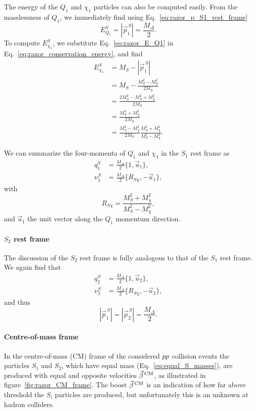 The energy of the $Q_1$ and $\chi_1$ particles can also be computed easily. 
From the masslessness of $Q_1$, we immediately find using Eq.~\ref{eq:razor_p_S1_rest_frame}
\begin{equation}
  E^S_{Q_1} = |\vec{p}^{\,S}_1| = \frac{M_\Delta}{2}. \label{eq:razor_E_Q1}
\end{equation}
To compute $E^S_{\chi_1}$, we substitute Eq.~\ref{eq:razor_E_Q1} in 
Eq.~\ref{eq:razor_conservation_energy}, and find 
\begin{align}
  E^S_{\chi_1} &= M_S - |\vec{p}^{\,S}_1|\\
	       &= M_S - \frac{M_S^2 -M_{\chi}^2}{2 M_S} \\
	       &= \frac{2M_S^2 - M_S^2 + M_{\chi}^2}{2 M_S} \\
	       &= \frac{M_S^2 + M_{\chi}^2}{2 M_S} \\
	       &= \frac{M_S^2 - M_{\chi}^2}{2 M_S} \frac{M_S^2 + M_{\chi}^2}{M_S^2 - M_{\chi}^2} .
\end{align}

We can summarize the four-momenta of $Q_1$ and $\chi_1$ in the $S_1$ rest frame as
\begin{align}
  q_1^S   &= \frac{M_\Delta}{2} \{ 1, \vec{u}_1\} , \\  
  \nu_1^S &= \frac{M_\Delta}{2} \{ R_{S\chi}, -\vec{u}_1\} ,
\end{align}
with $$R_{S\chi} = \frac{M_S^2 + M_{\chi}^2}{M_S^2 - M_{\chi}^2},$$ and $\vec{u}_1$ the unit
vector along the $Q_1$ momentum direction.



\paragraph{$S_2$ rest frame}
The discussion of the $S_2$ rest frame is fully analogous to that of the $S_1$ rest frame. We
again find that
\begin{align}
  q_2^S   &= \frac{M_\Delta}{2} \{ 1, \vec{u}_2\} , \\  
  \nu_2^S &= \frac{M_\Delta}{2} \{ R_{S\chi}, -\vec{u}_2\} ,
\end{align}
and thus
\begin{equation}
  |\vec{p}^{\,S}_1| = |\vec{p}^{\,S}_2| = \frac{M_\Delta}{2} . \label{eq:razor_equal_momenta}
\end{equation}


\paragraph{Centre-of-mass frame}
In the centre-of-mass (CM) frame of the considered ${p}{p}$ collision events the particles $S_1$
and $S_2$, which have equal mass (Eq.~\ref{eq:equal_S_masses}), are produced with equal and opposite
velocities $\vec{\beta}^{\,\textrm{CM}}$, as illustrated in figure~\ref{fig:razor_CM_frame}. The boost $\vec{\beta}^{\,\textrm{CM}}$ is an
indication of how far above threshold the $S_i$ particles are produced, but unfortunately this is
an unknown at hadron colliders. 

